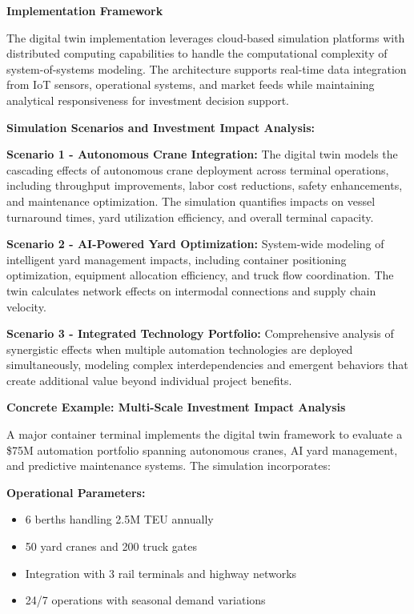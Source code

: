 \documentclass{article}
\begin{document}
\textbf{Implementation Framework}

The digital twin implementation leverages cloud-based simulation platforms with distributed computing capabilities to handle the computational complexity of system-of-systems modeling. The architecture supports real-time data integration from IoT sensors, operational systems, and market feeds while maintaining analytical responsiveness for investment decision support.

\textbf{Simulation Scenarios and Investment Impact Analysis:}

\textbf{Scenario 1 - Autonomous Crane Integration:} The digital twin models the cascading effects of autonomous crane deployment across terminal operations, including throughput improvements, labor cost reductions, safety enhancements, and maintenance optimization. The simulation quantifies impacts on vessel turnaround times, yard utilization efficiency, and overall terminal capacity.

\textbf{Scenario 2 - AI-Powered Yard Optimization:} System-wide modeling of intelligent yard management impacts, including container positioning optimization, equipment allocation efficiency, and truck flow coordination. The twin calculates network effects on intermodal connections and supply chain velocity.

\textbf{Scenario 3 - Integrated Technology Portfolio:} Comprehensive analysis of synergistic effects when multiple automation technologies are deployed simultaneously, modeling complex interdependencies and emergent behaviors that create additional value beyond individual project benefits.

\textbf{Concrete Example: Multi-Scale Investment Impact Analysis}

A major container terminal implements the digital twin framework to evaluate a \$75M automation portfolio spanning autonomous cranes, AI yard management, and predictive maintenance systems. The simulation incorporates:

\textbf{Operational Parameters:}
\begin{itemize}
\item 6 berths handling 2.5M TEU annually
\item 50 yard cranes and 200 truck gates
\item Integration with 3 rail terminals and highway networks
\item 24/7 operations with seasonal demand variations
\end{itemize}
\end{document}
